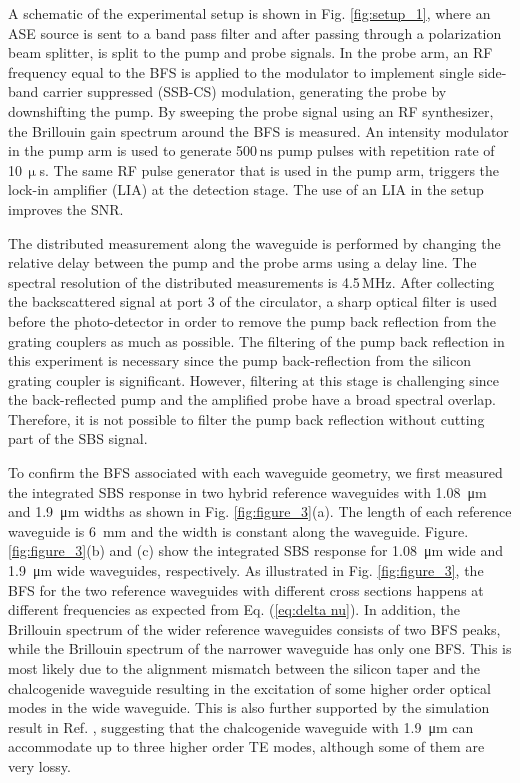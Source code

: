 \documentclass[superscriptaddress, nofootinbib, twocolumn, amsmath,amssymb, aps, pra, notitlepage, longbibliography]{revtex4-1}
\begin{document}
A schematic of the experimental setup is shown in Fig. \ref{fig:setup_1}, where an ASE source is sent to a band pass filter and after passing through a polarization beam splitter, is split to the pump and probe signals.
In the probe arm, an RF frequency equal to the BFS is applied to the modulator to implement single side-band carrier suppressed (SSB-CS) modulation, generating the probe by downshifting the pump. By sweeping the probe signal using an RF synthesizer, the Brillouin gain spectrum around the BFS is measured. An intensity modulator in the pump arm is used to generate 500\,ns pump pulses with repetition rate of 10\,$\upmu$s. The same RF pulse generator that is used in the pump arm, triggers the lock-in amplifier (LIA) at the detection stage. The use of an LIA in the setup improves the SNR.


The distributed measurement along the waveguide is performed by changing the relative delay between the pump and the probe arms using a delay line. The spectral resolution of the distributed measurements is 4.5\,MHz. 
After collecting the backscattered signal at port 3 of the circulator, a sharp optical filter is used before the photo-detector in order to remove the pump back reflection from the grating couplers as much as possible. The filtering of the pump back reflection in this experiment is necessary since the pump back-reflection from the silicon grating coupler is significant. However, filtering at this stage is challenging since the back-reflected pump and the amplified probe have a broad spectral overlap. Therefore, it is not possible to filter the pump back reflection without cutting part of the SBS signal. 



To confirm the BFS associated with each waveguide geometry, we first measured the integrated SBS response in two hybrid reference waveguides with \SI{1.08}{\um} and \SI{1.9}{\um} widths as shown in Fig. \ref{fig:figure_3}(a). The length of each reference waveguide is \SI{6}{\mm} and the width is constant along the waveguide. Figure. \ref{fig:figure_3}(b) and (c) show the integrated SBS response for \SI{1.08}{\um} wide and \SI{1.9}{\um} wide waveguides, respectively. As illustrated in Fig. \ref{fig:figure_3}, the BFS for the two reference waveguides with different cross sections happens at different frequencies as expected from Eq. (\ref{eq:delta nu}). In addition, the Brillouin spectrum of the wider reference waveguides consists of two BFS peaks, while the Brillouin spectrum of the narrower waveguide has only one BFS.
This is most likely due to the alignment mismatch between the silicon taper and the chalcogenide waveguide resulting in the excitation of some higher order optical modes in the wide waveguide. This is also further supported by the simulation result in Ref. \cite{Morrison2017}, suggesting that the chalcogenide waveguide with \SI{1.9}{\um} can accommodate up to three higher order TE modes, although some of them are very lossy.
\end{document}
